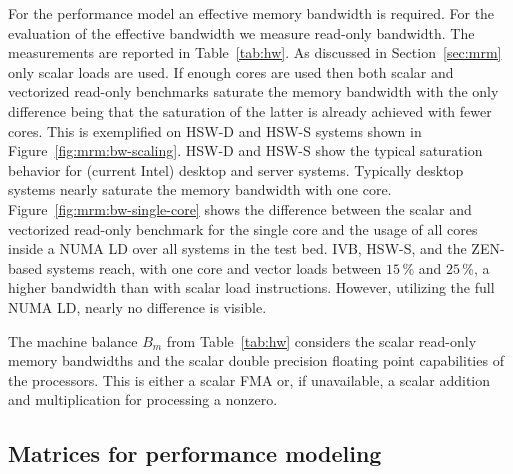 For the performance model an effective memory bandwidth is required.
For the evaluation of the effective bandwidth we measure read-only bandwidth.
The measurements are reported in Table~\ref{tab:hw}.
As discussed in Section~\ref{sec:mrm} only scalar loads are used.
%
If enough cores are used then both scalar and vectorized read-only benchmarks
saturate the memory bandwidth with the only difference being that the saturation of
the latter is already achieved with fewer cores.
This is exemplified on HSW-D and HSW-S systems shown in
Figure~\ref{fig:mrm:bw-scaling}.
HSW-D and HSW-S show the typical saturation behavior for (current Intel) desktop
and server systems.
Typically desktop systems nearly saturate the memory bandwidth with one core.
%
Figure~\ref{fig:mrm:bw-single-core} shows the difference between the scalar and
vectorized read-only benchmark for the single core and the usage of all cores
inside a NUMA LD over all systems in the test bed.
IVB, HSW-S, and the ZEN-based
systems reach,
with one core and vector loads between $15\,\%$ and
$25\,\%$,
a higher bandwidth
than with scalar load instructions.
However, utilizing the full NUMA LD, nearly no difference is visible.
%

The machine balance $B_m$ from Table~\ref{tab:hw} considers the scalar read-only
memory bandwidths and the scalar double precision floating point capabilities of
the processors.
This is either a scalar FMA or, if unavailable, a scalar addition and
multiplication for processing a nonzero.

\subsection{Matrices for performance modeling}

